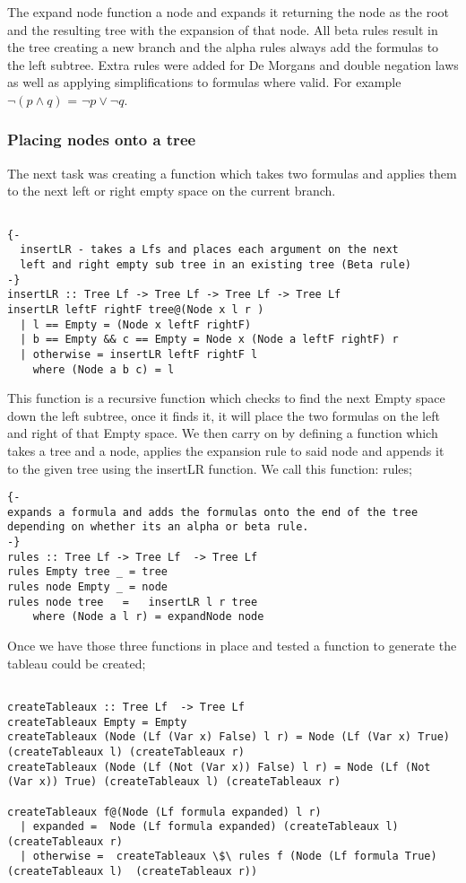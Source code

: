 \documentclass{article}%
\begin{document}
The expand node function a node and expands it returning the node as the root and the resulting tree with the expansion of that node. All beta rules result in the tree creating a new branch and the alpha rules always add the formulas to the left subtree. Extra rules were added for De Morgans and double negation laws as well as applying simplifications to formulas where valid. For example $\neg{(p\land q)}$ = $\neg{p} \lor \neg{q}$.

\subsubsection{Placing nodes onto a tree}
The next task was creating a function which takes two formulas and applies them to the next left or right empty space on the current branch. 
\begin{verbatim}

{-
  insertLR - takes a Lfs and places each argument on the next 
  left and right empty sub tree in an existing tree (Beta rule)
-}
insertLR :: Tree Lf -> Tree Lf -> Tree Lf -> Tree Lf 
insertLR leftF rightF tree@(Node x l r )
  | l == Empty = (Node x leftF rightF)
  | b == Empty && c == Empty = Node x (Node a leftF rightF) r
  | otherwise = insertLR leftF rightF l 
    where (Node a b c) = l
\end{verbatim}
This function is a recursive function which checks to find the next Empty space down the left subtree, once it finds it, it will place the two formulas on the left and right of that Empty space. 
We then carry on by defining a function which takes a tree and a node, applies the expansion rule to said node and appends it to the given tree using the insertLR function. We call this function: rules;
\begin{verbatim}
{-
expands a formula and adds the formulas onto the end of the tree depending on whether its an alpha or beta rule.
-}
rules :: Tree Lf -> Tree Lf  -> Tree Lf 
rules Empty tree _ = tree 
rules node Empty _ = node
rules node tree   =   insertLR l r tree
    where (Node a l r) = expandNode node 
\end{verbatim}
Once we have those three functions in place and tested a function to generate the tableau could be created;
\begin{verbatim}

createTableaux :: Tree Lf  -> Tree Lf
createTableaux Empty = Empty 
createTableaux (Node (Lf (Var x) False) l r) = Node (Lf (Var x) True) (createTableaux l) (createTableaux r)  
createTableaux (Node (Lf (Not (Var x)) False) l r) = Node (Lf (Not (Var x)) True) (createTableaux l) (createTableaux r)  

createTableaux f@(Node (Lf formula expanded) l r)
  | expanded =  Node (Lf formula expanded) (createTableaux l) (createTableaux r)
  | otherwise =  createTableaux \$\ rules f (Node (Lf formula True) (createTableaux l)  (createTableaux r)) 
\end{verbatim}
\end{document}
